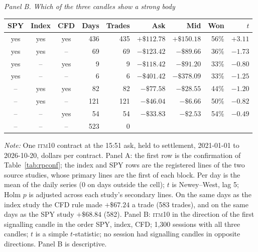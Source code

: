 \documentclass[12pt,letterpaper]{article}
\newcommand{\tabnotes}[1]{\par\vspace{5pt}\parbox{\linewidth}{\footnotesize\setlength{\parindent}{0pt}\textit{Note:} #1}\par}
\newcommand{\ITM}[1]{\textsc{itm}#1}
\newcommand{\dollar}{\$}
\begin{document}
\begin{table}[htbp]
\bigskip
\begin{minipage}{\linewidth}\centering
\textit{Panel B. Which of the three candles show a strong body}\par\smallskip
\begin{tabular}{@{}cccrrrrrr@{}}
\toprule
SPY & Index & CFD & Days & Trades & Ask & Mid & Won & $t$ \\
\midrule
yes & yes & yes & 436 & 435 & $+\dollar112.78$ & $+\dollar150.18$ & 56\% & $+3.11$ \\
yes & yes & -- & 69 & 69 & $-\dollar123.42$ & $-\dollar89.66$ & 36\% & $-1.73$ \\
yes & -- & yes & 9 & 9 & $-\dollar118.42$ & $-\dollar91.20$ & 33\% & $-0.80$ \\
yes & -- & -- & 6 & 6 & $-\dollar401.42$ & $-\dollar378.09$ & 33\% & $-1.25$ \\
-- & yes & yes & 82 & 82 & $-\dollar77.58$ & $-\dollar28.55$ & 44\% & $-1.20$ \\
-- & yes & -- & 121 & 121 & $-\dollar46.04$ & $-\dollar6.66$ & 50\% & $-0.82$ \\
-- & -- & yes & 54 & 54 & $-\dollar33.83$ & $-\dollar2.53$ & 54\% & $-0.49$ \\
-- & -- & -- & 523 & 0 & & & & \\
\bottomrule
\end{tabular}
\end{minipage}
\tabnotes{One \ITM{10} contract at the 15:51 ask, held to settlement, 2021-01-01
to 2026-10-20, dollars per contract. Panel A: the first row is the confirmation
of Table~\ref{tab:rpconf}; the index and SPY rows are the registered lines of the
two source studies, whose primary lines are the first of each block. Per day is
the mean of the daily series (0 on days outside the cell); $t$ is Newey--West,
lag 5; Holm $p$ is adjusted across each study's secondary lines. On the same days
as the index study the CFD rule made $+\dollar67.24$ a trade (583 trades), and on
the same days as the SPY study $+\dollar68.84$ (582). Panel B: \ITM{10} in the
direction of the first signalling candle in the order SPY, index, CFD; 1{,}300
sessions with all three candles; $t$ is a simple $t$-statistic; no session had
signalling candles in opposite directions. Panel B is descriptive.}
\end{table}
\end{document}
